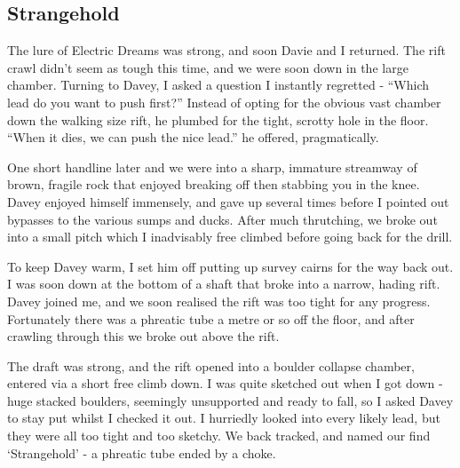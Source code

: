 \subsection{Strangehold}
\begin{marginfigure}
\end{marginfigure}
The lure of Electric Dreams was strong, and soon Davie and I returned. The rift crawl didn’t seem as tough this time, and we were soon down in the large chamber. Turning to Davey, I asked a question I instantly regretted - “Which lead do you want to push first?” Instead of opting for the obvious vast chamber down the walking size rift, he plumbed for the tight, scrotty hole in the floor. “When it dies, we can push the nice lead.” he offered, pragmatically.

One short handline later and we were into a sharp, immature streamway of brown, fragile rock that enjoyed breaking off then stabbing you in the knee. Davey enjoyed himself immensely, and gave up several times before I pointed out bypasses to the various sumps and ducks. After much thrutching, we broke out into a small pitch which I inadvisably free climbed before going back for the drill.

To keep Davey warm, I set him off putting up survey cairns for the way back out. I was soon down at the bottom of a shaft that broke into a narrow, hading rift. Davey joined me, and we soon realised the rift was too tight for any progress. Fortunately there was a phreatic tube a metre or so off the floor, and after crawling through this we broke out above the rift.

The draft was strong, and the rift opened into a boulder collapse chamber, entered via a short free climb down. I was quite sketched out when I got down - huge stacked boulders, seemingly unsupported and ready to fall, so I asked Davey to stay put whilst I checked it out. I hurriedly looked into every likely lead, but they were all too tight and too sketchy. We back tracked, and named our find ‘Strangehold’ - a phreatic tube ended by a choke.

